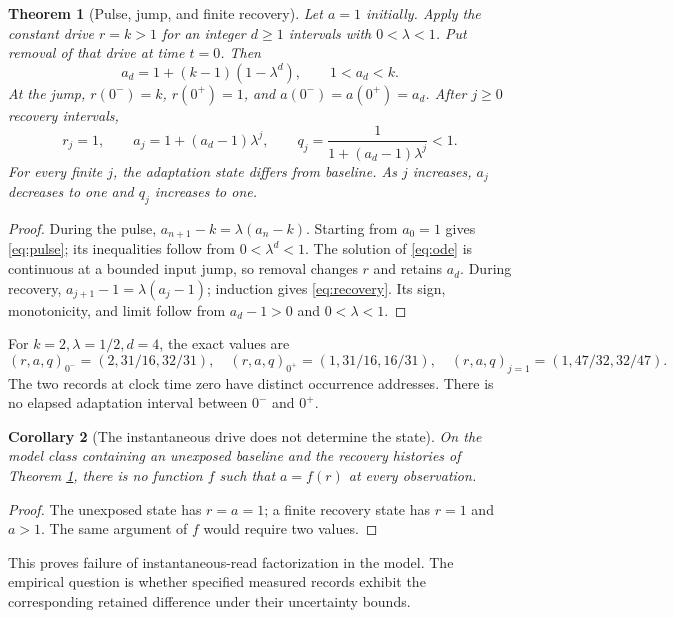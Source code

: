 \documentclass[11pt]{article}
\newtheorem{theorem}{Theorem}
\newtheorem{corollary}[theorem]{Corollary}
\begin{document}
\begin{theorem}[Pulse, jump, and finite recovery]\label{thm:return}
Let \(a=1\) initially. Apply the constant drive \(r=k>1\) for an
integer \(d\ge1\) intervals with \(0<\lambda<1\). Put removal of
that drive at time \(t=0\). Then
\begin{equation}\label{eq:pulse}
 a_d=1+(k-1)(1-\lambda^d),\qquad 1<a_d<k.
\end{equation}
At the jump, \(r(0^-)=k\), \(r(0^+)=1\), and
\(a(0^-)=a(0^+)=a_d\). After \(j\ge0\) recovery intervals,
\begin{equation}\label{eq:recovery}
 r_j=1,\qquad
 a_j=1+(a_d-1)\lambda^j,\qquad
 q_j=\frac1{1+(a_d-1)\lambda^j}<1.
\end{equation}
For every finite \(j\), the adaptation state differs from baseline.
As \(j\) increases, \(a_j\) decreases to one and \(q_j\) increases to one.
\end{theorem}
\begin{proof}
During the pulse, \(a_{n+1}-k=\lambda(a_n-k)\). Starting from
\(a_0=1\) gives \eqref{eq:pulse}; its inequalities follow from
\(0<\lambda^d<1\).
The solution of \eqref{eq:ode} is continuous at a bounded input jump,
so removal changes \(r\) and retains \(a_d\).
During recovery, \(a_{j+1}-1=\lambda(a_j-1)\); induction gives
\eqref{eq:recovery}. Its sign, monotonicity, and limit follow from
\(a_d-1>0\) and \(0<\lambda<1\).
\end{proof}

For \(k=2,\lambda=1/2,d=4\), the exact values are
\[
 (r,a,q)_{0^-}=(2,31/16,32/31),\quad
 (r,a,q)_{0^+}=(1,31/16,16/31),\quad
 (r,a,q)_{j=1}=(1,47/32,32/47).
\]
The two records at clock time zero have distinct occurrence addresses.
There is no elapsed adaptation interval between \(0^-\) and \(0^+\).

\begin{corollary}[The instantaneous drive does not determine the state]
\label{cor:nonfactor}
On the model class containing an unexposed baseline and the recovery
histories of Theorem \ref{thm:return}, there is no function \(f\) such
that \(a=f(r)\) at every observation.
\end{corollary}
\begin{proof}
The unexposed state has \(r=a=1\); a finite recovery state has \(r=1\)
and \(a>1\). The same argument of \(f\) would require two values.
\end{proof}
This proves failure of instantaneous-read factorization in the model.
The empirical question is whether specified measured records exhibit
the corresponding retained difference under their uncertainty bounds.
\end{document}
